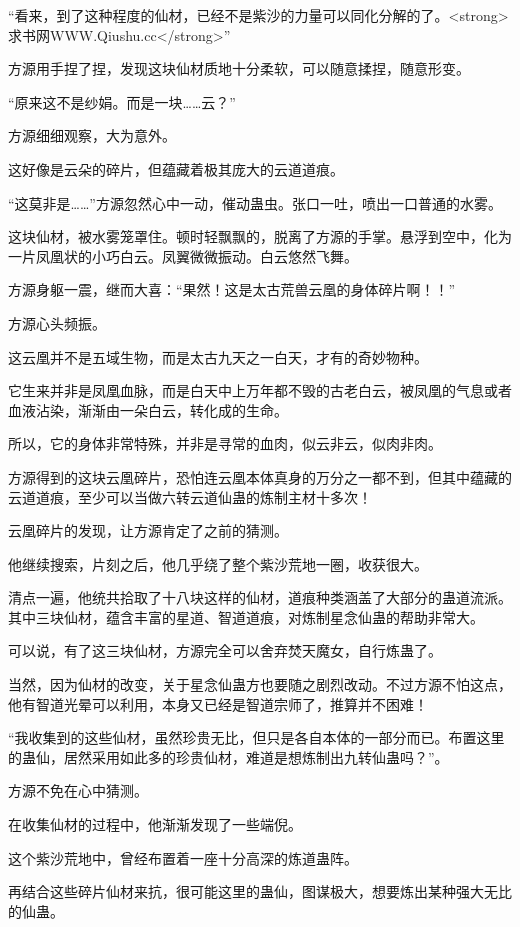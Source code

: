 \begin{this_body}
“看来，到了这种程度的仙材，已经不是紫沙的力量可以同化分解的了。<strong>求书网WWW.Qiushu.cc</strong>”

方源用手捏了捏，发现这块仙材质地十分柔软，可以随意揉捏，随意形变。

“原来这不是纱娟。而是一块……云？”

方源细细观察，大为意外。

这好像是云朵的碎片，但蕴藏着极其庞大的云道道痕。

“这莫非是……”方源忽然心中一动，催动蛊虫。张口一吐，喷出一口普通的水雾。

这块仙材，被水雾笼罩住。顿时轻飘飘的，脱离了方源的手掌。悬浮到空中，化为一片凤凰状的小巧白云。凤翼微微振动。白云悠然飞舞。

方源身躯一震，继而大喜：“果然！这是太古荒兽云凰的身体碎片啊！！”

方源心头频振。

这云凰并不是五域生物，而是太古九天之一白天，才有的奇妙物种。

它生来并非是凤凰血脉，而是白天中上万年都不毁的古老白云，被凤凰的气息或者血液沾染，渐渐由一朵白云，转化成的生命。

所以，它的身体非常特殊，并非是寻常的血肉，似云非云，似肉非肉。

方源得到的这块云凰碎片，恐怕连云凰本体真身的万分之一都不到，但其中蕴藏的云道道痕，至少可以当做六转云道仙蛊的炼制主材十多次！

云凰碎片的发现，让方源肯定了之前的猜测。

他继续搜索，片刻之后，他几乎绕了整个紫沙荒地一圈，收获很大。

清点一遍，他统共拾取了十八块这样的仙材，道痕种类涵盖了大部分的蛊道流派。其中三块仙材，蕴含丰富的星道、智道道痕，对炼制星念仙蛊的帮助非常大。

可以说，有了这三块仙材，方源完全可以舍弃焚天魔女，自行炼蛊了。

当然，因为仙材的改变，关于星念仙蛊方也要随之剧烈改动。不过方源不怕这点，他有智道光晕可以利用，本身又已经是智道宗师了，推算并不困难！

“我收集到的这些仙材，虽然珍贵无比，但只是各自本体的一部分而已。布置这里的蛊仙，居然采用如此多的珍贵仙材，难道是想炼制出九转仙蛊吗？”。

方源不免在心中猜测。

在收集仙材的过程中，他渐渐发现了一些端倪。

这个紫沙荒地中，曾经布置着一座十分高深的炼道蛊阵。

再结合这些碎片仙材来抗，很可能这里的蛊仙，图谋极大，想要炼出某种强大无比的仙蛊。


\end{this_body}
